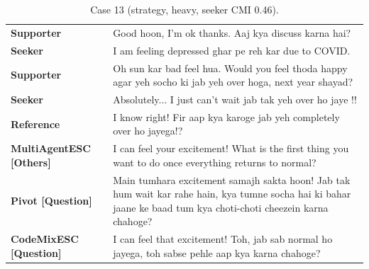 \begin{table}[t]
\centering\footnotesize
\caption{Case 13 (strategy, heavy, seeker CMI 0.46).}
\label{tab:case13}
\begin{tabular}{@{}p{}p{}@{}}
\toprule
\textbf{Supporter} & Good hoon, I'm ok thanks. Aaj kya discuss karna hai? \\
\textbf{Seeker} & I am feeling depressed ghar pe reh kar due to COVID. \\
\textbf{Supporter} & Oh sun kar bad feel hua. Would you feel thoda happy agar yeh socho ki jab yeh over hoga, next year shayad? \\
\textbf{Seeker} & Absolutely... I just can't wait jab tak yeh over ho jaye !! \\
\textbf{Reference} & I know right! Fir aap kya karoge jab yeh completely over ho jayega!? \\
\textbf{MultiAgentESC [Others]} & I can feel your excitement! What is the first thing you want to do once everything returns to normal? \\
\textbf{Pivot [Question]} & Main tumhara excitement samajh sakta hoon! Jab tak hum wait kar rahe hain, kya tumne socha hai ki bahar jaane ke baad tum kya choti-choti cheezein karna chahoge? \\
\textbf{CodeMixESC [Question]} & I can feel that excitement! Toh, jab sab normal ho jayega, toh sabse pehle aap kya karna chahoge? \\
\bottomrule
\end{tabular}
\end{table}

